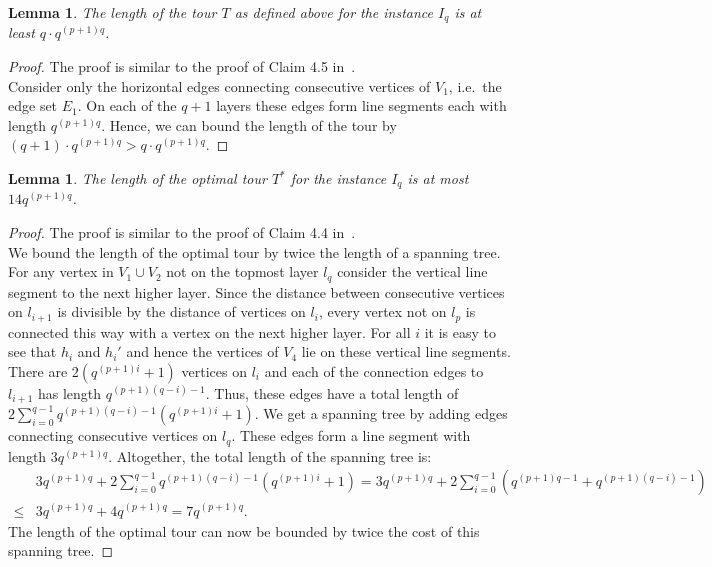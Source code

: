 \documentclass[a4paper, 11pt]{article}
\newtheorem{lemma}[theorem]{Lemma}
\begin{document}
\begin{lemma} \label{k-Opt Euc T bound}
The length of the tour $T$ as defined above for the instance $I_q$ is at least $q\cdot q^{(p+1)q}$.
\end{lemma}

\begin{proof}
The proof is similar to the proof of Claim 4.5 in~\cite{CKT1999}.\\
Consider only the horizontal edges connecting consecutive vertices of $V_1$, i.e.\ the edge set $E_1$. On each of the $q+1$ layers these edges form line segments each with length $q^{(p+1)q}$. Hence, we can bound the length of the tour by $(q+1)\cdot q^{(p+1)q}>q\cdot q^{(p+1)q}$.
\end{proof}


\begin{lemma} \label{k-Opt Euc opt bound}
The length of the optimal tour $T^*$ for the instance $I_q$ is at most $14q^{(p+1)q}$.
\end{lemma}

\begin{proof}
The proof is similar to the proof of Claim 4.4 in~\cite{CKT1999}.\\
We bound the length of the optimal tour by twice the length of a spanning tree. For any vertex in $V_1 \cup V_2$ not on the topmost layer $l_q$ consider the vertical line segment to the next higher layer. Since the distance between consecutive vertices on $l_{i+1}$ is divisible by the distance of vertices on $l_i$, every vertex not on $l_p$ is connected this way with a vertex on the next higher layer. For all $i$ it is easy to see that $h_i$ and $h_i'$ and hence the vertices of $V_4$ lie on these vertical line segments. There are $2\left(q^{(p+1)i}+1\right)$ vertices on $l_i$ and each of the connection edges to $l_{i+1}$ has length $q^{(p+1)(q-i)-1}$. Thus, these edges have a total length of $2\sum_{i=0}^{q-1}q^{(p+1)(q-i)-1}\left(q^{(p+1)i}+1\right)$. We get a spanning tree by adding edges connecting consecutive vertices on $l_q$. These edges form a line segment with length $3q^{(p+1)q}$. Altogether, the total length of the spanning tree is:
\begin{align*}
&3q^{(p+1)q}+2\sum_{i=0}^{q-1}q^{(p+1)(q-i)-1}\left(q^{(p+1)i}+1\right)=3q^{(p+1)q}+2\sum_{i=0}^{q-1}\left(q^{(p+1)q-1}+q^{(p+1)(q-i)-1}\right)\\
\leq &3q^{(p+1)q}+ 4q^{(p+1)q}=7q^{(p+1)q}.
\end{align*}
The length of the optimal tour can now be bounded by twice the cost of this spanning tree.
\end{proof}
\end{document}
